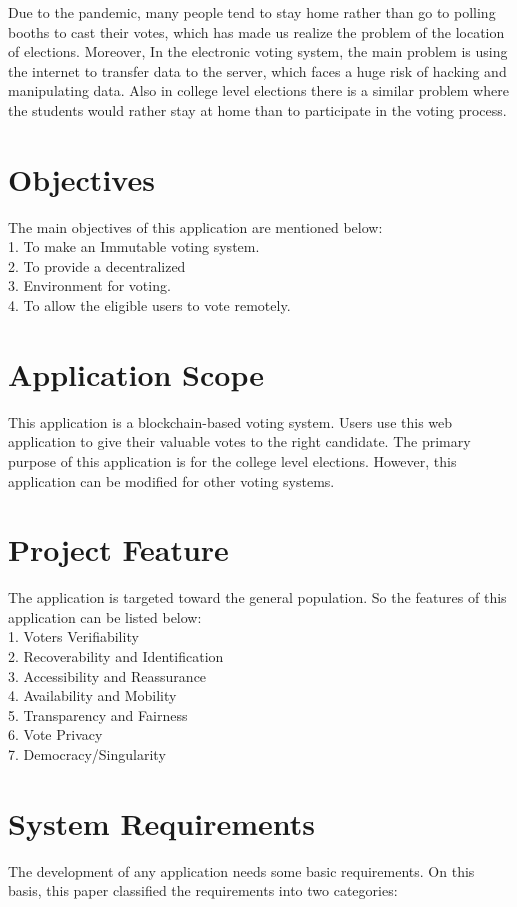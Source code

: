 \documentclass[a4paper,12pt]{report}
\begin{document}
Due to the pandemic, many people tend to stay home rather than go to polling booths to cast their votes, which has made us realize the problem of the location of elections. Moreover, In the electronic voting system, the main problem is using the internet to transfer data to the server, which faces a huge risk of hacking and manipulating data. 
Also in college level elections there is a similar problem where the students would rather stay at home than to participate in the voting process.

\section{Objectives}
The main objectives of this application are mentioned below:\\
1. To make an Immutable voting system.\\
2. To provide a decentralized \\
3. Environment for voting.\\
4. To allow the eligible users to vote remotely.

\section{Application Scope}
This application is a blockchain-based voting system. Users use this web application to give their valuable votes to the right candidate. The primary purpose of this application is for the college level elections. However, this application can be modified for other voting systems.

\section{Project Feature}
The application is targeted toward the general population. So the features of this application can be listed below:\\
1. Voters Verifiability\\
2. Recoverability and Identification\\
3. Accessibility and Reassurance\\
4. Availability and Mobility\\
5. Transparency and Fairness\\
6. Vote Privacy\\
7. Democracy/Singularity

\section{System Requirements}
The development of any application needs some basic requirements. On this basis, this paper classified the requirements into two categories:
\end{document}
